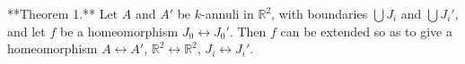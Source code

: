 **Theorem 1.** Let $A$ and $A'$ be $k$-annuli in $\mathbb{R}^2$, with boundaries $\bigcup J_i$ and $\bigcup J_i'$, and let $f$ be a homeomorphism $J_0 \leftrightarrow J_0'$. Then $f$ can be extended so as to give a homeomorphism $A \leftrightarrow A'$, $\mathbb{R}^2 \leftrightarrow \mathbb{R}^2$, $J_i \leftrightarrow J_i'$.
